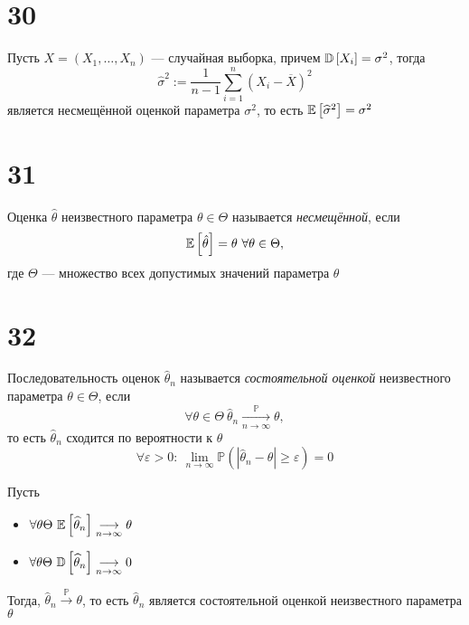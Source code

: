 \documentclass{article}
\begin{document}
\section*{30}
\theorem Пусть $X=(X_1,\ldots,X_n)$ — случайная выборка, причем $\mathbb{D}\left[X_i\right]=\sigma^2$, тогда 
\begin{equation*}
    \widehat{\sigma}^2:=\displaystyle\frac{1}{n-1}\sum_{i=1}^n (X_i-\overline{X})^2
\end{equation*}
является несмещённой оценкой параметра $\sigma^2$, то есть $\mathbb{E}\left[\widehat{\sigma}^2\right]=\sigma^2$

\section*{31}
Оценка $\hat{\theta}$ неизвестного параметра $\theta\in\Theta$ называется \textit{несмещённой}, если 
\begin{equation*}
    \matwait{\hat{\theta}}=\theta\ \forall\theta\in\Theta,
\end{equation*}
где $\Theta$ — множество всех допустимых значений параметра $\theta$

\section*{32}
 Последовательность оценок $\hat{\theta}_n$ называется \textit{состоятельной оценкой} неизвестного параметра $\theta\in\Theta$, если
\begin{equation*}
    \forall \theta\in\Theta\ \hat{\theta}_n\underset{n\to\infty}{\overset{\mathbb{P}}{\longrightarrow}}\theta,
\end{equation*}
то есть $\hat{\theta}_n$ сходится по вероятности к $\theta$
\begin{equation*}
    \forall\varepsilon>0:\ \lim\limits_{n\to\infty}\mathbb{P}(|\hat{\theta}_n-\theta|\geqslant\varepsilon)=0
\end{equation*}


\theorem Пусть 
\begin{itemize}
    \item $\forall\theta\Theta\ \matwait{\widehat{\theta}_n}\underset{n\to\infty}{\longrightarrow}\theta$
    \item $\forall\theta\Theta\ \dispersia{\widehat{\theta}_n}\underset{n\to\infty}{\longrightarrow}0$
\end{itemize}
Тогда, $\widehat{\theta}_n\overset{\mathbb{P}}{\longrightarrow}\theta$, то есть $\widehat{\theta}_n$ является состоятельной оценкой  неизвестного параметра $\theta$
\end{document}
